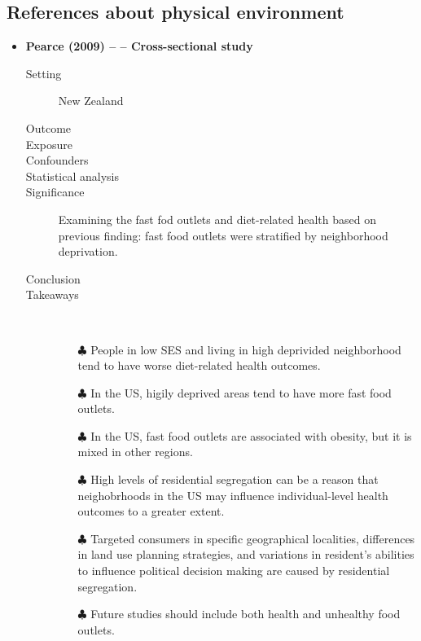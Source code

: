 \documentclass{article}
\begin{document}
\subsection{References about physical environment}

\begin{itemize}
		\item {\bf Pearce (2009) -- -- Cross-sectional study}
				\begin{description}
						\item[Setting] New Zealand
						\item[Outcome]
						\item[Exposure]
						\item[Confounders]
						\item[Statistical analysis]
						\item[Significance] Examining the fast fod outlets and diet-related health based on previous finding: fast food outlets were stratified by neighborhood deprivation.
						\item[Conclusion]
    	         		\item[Takeaways] \mbox{}\\ 
    			        	\begin{itemize}
									\item[$\clubsuit$] People in low SES and living in high deprivided neighborhood tend to have worse diet-related health outcomes.
									\item[$\clubsuit$] In the US, higily deprived areas tend to have more fast food outlets.
									\item[$\clubsuit$] In the US, fast food outlets are associated with obesity, but it is mixed in other regions.
									\item[$\clubsuit$] High levels of residential segregation can be a reason that neighobrhoods in the US may influence individual-level health outcomes to a greater extent.  
									\item[$\clubsuit$] Targeted consumers in specific geographical localities, differences in land use planning strategies, and variations in resident's abilities to influence political decision making are caused by residential segregation.
									\item[$\clubsuit$] Future studies should include both health and unhealthy food outlets. 
							\end{itemize}
			    \end{description}


\end{itemize}
\end{document}
